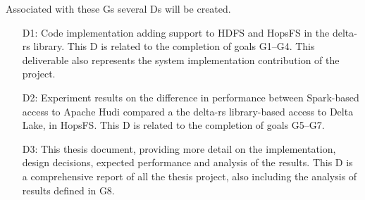 Associated with these \glspl{G} several \glspl{D} will be created. 
\begin{enumerate}
    \item[D1:] Code implementation adding support to \gls{HDFS} and \gls{HopsFS} in the delta-rs library. This \gls{D} is related to the completion of goals G1--G4. This deliverable also represents the system implementation contribution of the project.
    \item[D2:] Experiment results on the difference in performance between Spark-based access to Apache Hudi compared a the delta-rs library-based access to Delta Lake, in \gls{HopsFS}.
    This \gls{D} is related to the completion of goals G5--G7.
    \item[D3:] This thesis document, providing more detail on the implementation, design decisions, expected performance and analysis of the results.
    This \gls{D} is a comprehensive report of all the thesis project, also including the analysis of results defined in G8.
\end{enumerate}
